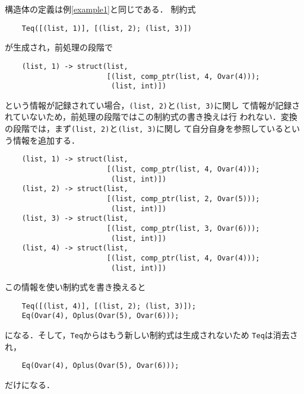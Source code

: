 \begin{example}[変換: Teq]
  構造体の定義は例\ref{example1}と同じである．
  制約式
\begin{verbatim}
    Teq([(list, 1)], [(list, 2); (list, 3)])
\end{verbatim}
  が生成され，前処理の段階で
\begin{verbatim}
    (list, 1) -> struct(list,
                        [(list, comp_ptr(list, 4, Ovar(4)));
                         (list, int)])
\end{verbatim}
  という情報が記録されてい場合，\verb|(list, 2)|と\verb|(list, 3)|に関し
  て情報が記録されていないため，前処理の段階ではこの制約式の書き換えは行
  われない．変換の段階では，まず\verb|(list, 2)|と\verb|(list, 3)|に関し
  て自分自身を参照しているという情報を追加する．
\begin{verbatim}
    (list, 1) -> struct(list,
                        [(list, comp_ptr(list, 4, Ovar(4)));
                         (list, int)])
    (list, 2) -> struct(list,
                        [(list, comp_ptr(list, 2, Ovar(5)));
                         (list, int)])
    (list, 3) -> struct(list,
                        [(list, comp_ptr(list, 3, Ovar(6)));
                         (list, int)])
    (list, 4) -> struct(list,
                        [(list, comp_ptr(list, 4, Ovar(4)));
                         (list, int)])
\end{verbatim}
  この情報を使い制約式を書き換えると
\begin{verbatim}
    Teq([(list, 4)], [(list, 2); (list, 3)]);
    Eq(Ovar(4), Oplus(Ovar(5), Ovar(6)));
\end{verbatim}
  になる．そして，\texttt{Teq}からはもう新しい制約式は生成されないため
  \texttt{Teq}は消去され，
\begin{verbatim}
    Eq(Ovar(4), Oplus(Ovar(5), Ovar(6)));
\end{verbatim}
  だけになる．
\end{example}